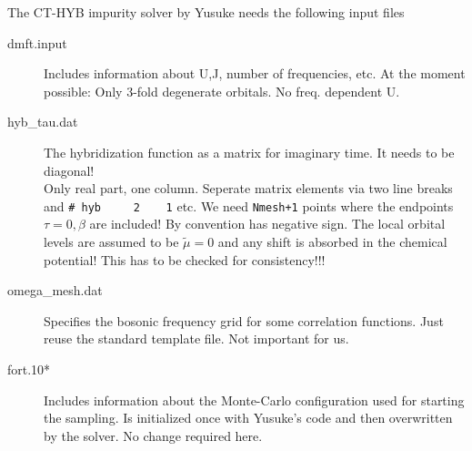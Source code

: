 \documentclass[12pt,a4paper]{scrartcl}
\numberwithin{equation}{section}
\newcommand{\cng}[1]{{\color{red}#1}}
\begin{document}
The CT-HYB impurity solver by Yusuke needs the following input files
\begin{description}
\item[dmft.input] Includes information about U,J, number of frequencies, etc. At the moment
possible: Only 3-fold degenerate orbitals. No freq. dependent U.

\item[hyb\_tau.dat] The hybridization function as a matrix for imaginary time. 
It needs to be diagonal! \\
Only real part, one column. Seperate matrix elements
via two line breaks and \verb|# hyb     2    1| etc. We need \verb|Nmesh+1|
points where the endpoints $\tau=0,\beta$ are included! By convention has negative sign.
\cng{The local orbital levels are assumed to be $\tilde{\mu}=0$ and any
shift is absorbed in the chemical potential! This has to 
be checked for consistency!!!}

\item[omega\_mesh.dat] Specifies the bosonic frequency grid for some 
correlation functions. Just reuse the standard template file. Not important for us.

\item[fort.10*] Includes information about the Monte-Carlo configuration used
for starting the sampling. Is initialized once with Yusuke's code and then overwritten by 
the solver. No change required here.
\end{description}

\clearpage
\end{document}
